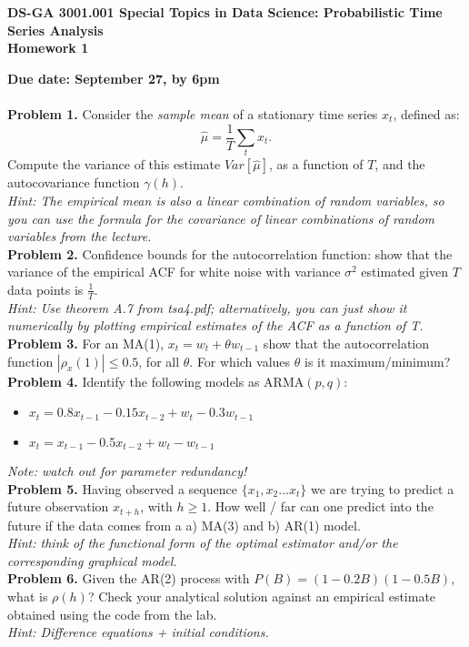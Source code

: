 \documentclass[12pt]{article}
\begin{document}
\thispagestyle{empty}
\begin{center}

\textbf{DS-GA 3001.001 Special Topics in Data Science: Probabilistic Time Series Analysis\\
Homework 1}
\end{center}

\noindent \textbf{Due date: September 27, by 6pm}\\
\\
\noindent \textbf{Problem 1. } Consider the \emph{sample mean} of a stationary time series  $x_t$, defined as:
\begin{equation}
\hat{\mu} = \frac{1}{T} \sum_t x_t.
\end{equation}
Compute the variance of this estimate $Var[\hat{\mu}]$, as a function of $T$, and the autocovariance function $\gamma(h)$.\\
\emph{Hint: The empirical mean is also a linear combination of random variables, so you can use the formula for the covariance of linear combinations of random variables from the lecture. }\\


\noindent \textbf{Problem 2. } Confidence bounds for the autocorrelation function: 
show that the variance of the empirical ACF for white noise with variance $\sigma^2$ estimated given $T$ data points is $\frac{1}{T}$.\\
\emph{Hint: Use theorem A.7 from tsa4.pdf; alternatively, you can just show it numerically by plotting empirical estimates of the ACF as a function of T. }\\


\noindent \textbf{Problem 3. } 
For an MA(1), $x_t = w_t + \theta w_{t-1}$ show that the autocorrelation function $|\rho_x(1) | \leq 0.5$, for all $\theta$. 
For which values $\theta$ is it maximum/minimum?\\


\noindent \textbf{Problem 4. } Identify the following models as $\mathrm{ARMA}(p,q)$:
\begin{itemize}
\item $x_t = 0.8 x_{t-1} - 0.15 x_{t-2} + w_t - 0.3 w_{t-1}$
\item $x_t =  x_{t-1} - 0.5 x_{t-2} + w_t - w_{t-1}$
\end{itemize}
\emph{Note: watch out for parameter redundancy!}\\

\noindent \textbf{Problem 5.} Having observed a sequence  $\{x_1,x_2... x_t \}$ we are trying to predict a future observation $x_{t+h}$, with $h\geq1$.
How well / far can one predict into the future if the data comes from a a) MA(3) and b) AR(1) model. \\
\emph{Hint: think of the functional form of the optimal estimator and/or the corresponding graphical model.}\\


\noindent \textbf{Problem 6.} Given the AR(2) process with $P(B) = (1-0.2B)(1-0.5B)$, what is $\rho(h)$? 
 Check your analytical solution against an empirical estimate obtained using the code from the lab.\\
\emph{Hint: Difference equations + initial conditions.}
\end{document}
